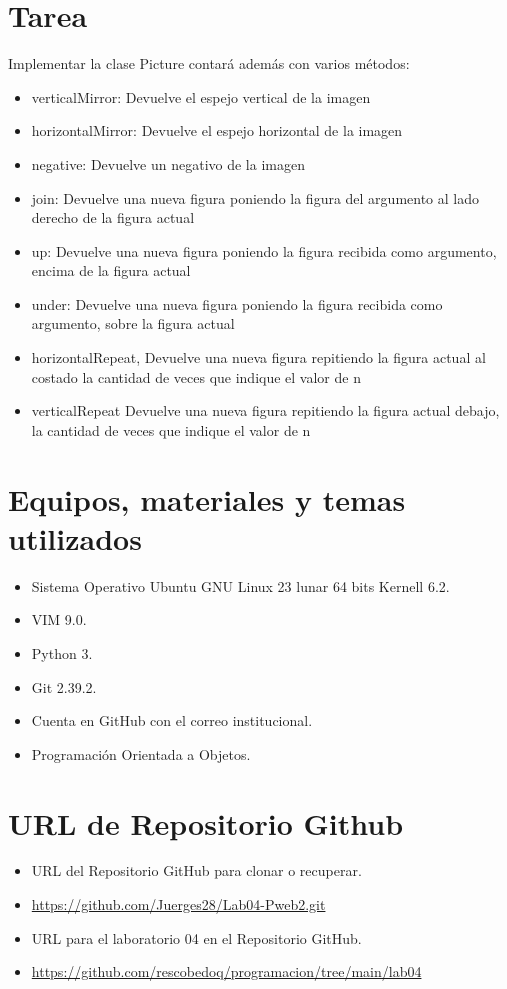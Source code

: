 \documentclass{article}
\begin{document}
	\section{Tarea}
    Implementar la clase Picture contará además con varios métodos:
	\begin{itemize}	
		\item verticalMirror: Devuelve el espejo vertical de la imagen
		\item horizontalMirror: Devuelve el espejo horizontal de la imagen
        \item negative: Devuelve un negativo de la imagen
        \item join: Devuelve una nueva figura poniendo la figura del argumento al lado derecho de la figura actual
        \item up: Devuelve una nueva figura poniendo la figura recibida como argumento, encima de la figura actual
        \item under: Devuelve una nueva figura poniendo la figura recibida como argumento, sobre la figura actual
        \item horizontalRepeat, Devuelve una nueva figura repitiendo la figura actual al costado la cantidad de veces que indique el valor de n
        \item verticalRepeat Devuelve una nueva figura repitiendo la figura actual debajo, la cantidad de veces que indique el valor de n
	\end{itemize}
		
	\section{Equipos, materiales y temas utilizados}
	\begin{itemize}
		\item Sistema Operativo Ubuntu GNU Linux 23 lunar 64 bits Kernell 6.2.
		\item VIM 9.0.
		\item Python 3.
		\item Git 2.39.2.
		\item Cuenta en GitHub con el correo institucional.
		\item Programación Orientada a Objetos.	
	\end{itemize}
	
	\section{URL de Repositorio Github}
	\begin{itemize}
		\item URL del Repositorio GitHub para clonar o recuperar.
		\item \url{https://github.com/Juerges28/Lab04-Pweb2.git}
		\item URL para el laboratorio 04 en el Repositorio GitHub.
		\item \url{https://github.com/rescobedoq/programacion/tree/main/lab04}
	\end{itemize}
	
\end{document}
